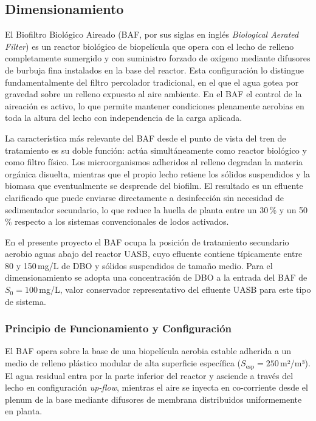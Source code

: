 \subsection{Dimensionamiento}

El Biofiltro Biológico Aireado (BAF, por sus siglas en inglés \textit{Biological Aerated Filter}) es un reactor biológico de biopelícula que opera con el lecho de relleno completamente sumergido y con suministro forzado de oxígeno mediante difusores de burbuja fina instalados en la base del reactor. Esta configuración lo distingue fundamentalmente del filtro percolador tradicional, en el que el agua gotea por gravedad sobre un relleno expuesto al aire ambiente. En el BAF el control de la aireación es activo, lo que permite mantener condiciones plenamente aerobias en toda la altura del lecho con independencia de la carga aplicada.

La característica más relevante del BAF desde el punto de vista del tren de tratamiento es su doble función: actúa simultáneamente como reactor biológico y como filtro físico. Los microorganismos adheridos al relleno degradan la materia orgánica disuelta, mientras que el propio lecho retiene los sólidos suspendidos y la biomasa que eventualmente se desprende del biofilm. El resultado es un efluente clarificado que puede enviarse directamente a desinfección sin necesidad de sedimentador secundario, lo que reduce la huella de planta entre un 30\,\% y un 50\,\% respecto a los sistemas convencionales de lodos activados.

En el presente proyecto el BAF ocupa la posición de tratamiento secundario aerobio aguas abajo del reactor UASB, cuyo efluente contiene típicamente entre 80 y 150\,mg/L de DBO y sólidos suspendidos de tamaño medio. Para el dimensionamiento se adopta una concentración de DBO a la entrada del BAF de $S_0 = 100$\,mg/L, valor conservador representativo del efluente UASB para este tipo de sistema.

\subsubsection*{Principio de Funcionamiento y Configuración}

El BAF opera sobre la base de una biopelícula aerobia estable adherida a un medio de relleno plástico modular de alta superficie específica ($S_{\text{esp}} = 250$\,m²/m³). El agua residual entra por la parte inferior del reactor y asciende a través del lecho en configuración \textit{up-flow}, mientras el aire se inyecta en co-corriente desde el plenum de la base mediante difusores de membrana distribuidos uniformemente en planta.

